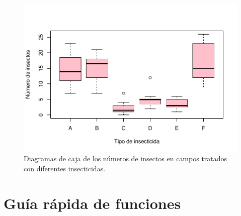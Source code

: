 \documentclass[
]{book}
\theoremstyle{definition}
\theoremstyle{definition}
\theoremstyle{definition}
\theoremstyle{remark}
\begin{document}
\begin{figure}

{\centering \includegraphics[width=0.9\linewidth]{12chap12_Descripcion_cuantitativos_files/figure-latex/188-1} 

}

\caption{Diagramas de caja de los números de insectos en campos tratados con diferentes insecticidas.}\label{fig:188}
\end{figure}

\hypertarget{guuxeda-ruxe1pida-de-funciones-6}{%
\section{Guía rápida de funciones}\label{guuxeda-ruxe1pida-de-funciones-6}}
\end{document}
